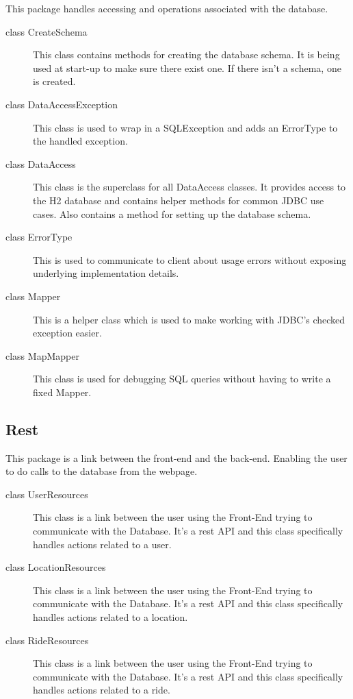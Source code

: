 \documentclass{article}
\begin{document}
This package handles accessing and operations associated with the database.

\begin{description}
    \item[class CreateSchema] This class contains methods for creating the database schema. It is being used at start-up to make sure there exist one. If there isn't a schema, one is created.
    \item[class DataAccessException] This class is used to wrap in a SQLException and adds an ErrorType to the handled exception.
    \item[class DataAccess] This class is the superclass for all DataAccess classes. It provides access to the H2 database and contains helper methods for common JDBC use cases. Also contains a method for setting up the database schema.
    \item[class ErrorType] This is used to communicate to client about usage errors without exposing underlying implementation details.
    \item[class Mapper] This is a helper class which is used to make working with JDBC's checked exception easier.
    \item[class MapMapper] This class is used for debugging SQL queries without having to write a fixed Mapper.
\end{description}

\subsection{Rest}

This package is a link between the front-end and the back-end. Enabling the user to do calls to the database from the webpage.

\begin{description}
    \item[class UserResources] This class is a link between the user using the Front-End trying to communicate with the Database. It's a rest API and this class specifically handles actions related to a user.
    \item[class LocationResources] This class is a link between the user using the Front-End trying to communicate with the Database. It's a rest API and this class specifically handles actions related to a location.
    \item[class RideResources] This class is a link between the user using the Front-End trying to communicate with the Database. It's a rest API and this class specifically handles actions related to a ride.
\end{description}
\end{document}
